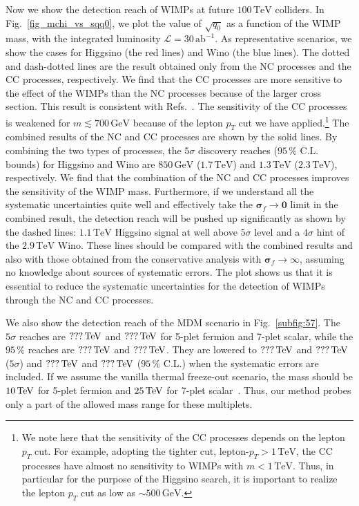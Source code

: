 \documentclass[12pt,twoside,book]{article}
\begin{document}
Now we show the detection reach of WIMPs at future $100\,\mathrm{TeV}$ colliders.
In Fig.~\ref{fig_mchi_vs_sqq0}, we plot the value of $\sqrt{q_0}$ as a function of the WIMP mass, with the integrated luminosity $\mathcal{L}=30\,\mathrm{ab}^{-1}$.
As representative scenarios, we show the cases for Higgsino (the red lines) and Wino (the blue lines).
The dotted and dash-dotted lines are the result obtained only from the NC processes and the CC processes, respectively.
We find that the CC processes are more sensitive to the effect of the WIMPs than the NC processes because of the larger cross section.
This result is consistent with Refs.~\cite{DiLuzio:2018jwd,Matsumoto:2018ioi}.
The sensitivity of the CC processes is weakened for $m \lesssim 700\, \mathrm{GeV}$ because of the lepton $p_T$ cut we have applied.\footnote
{
  We note here that the sensitivity of the CC processes depends on the lepton $p_T$ cut.
  For example, adopting the tighter cut, lepton-$p_T > 1\,\mathrm{TeV}$, the CC processes have almost no sensitivity to WIMPs with $m < 1\,\mathrm{TeV}$.
  Thus, in particular for the purpose of the Higgsino search, it is important to realize the lepton $p_T$ cut as low as $\sim 500\, \mathrm{GeV}$.
}
The combined results of the NC and CC processes are shown by the solid lines.
By combining the two types of processes, the $5\sigma$ discovery reaches ($95\,\%$ C.L. bounds) for Higgsino and Wino are $850\,\mathrm{GeV}$ ($1.7\,\mathrm{TeV}$) and $1.3\,\mathrm{TeV}$ ($2.3\,\mathrm{TeV}$), respectively.
We find that the combination of the NC and CC processes improves the sensitivity of the WIMP mass.
Furthermore, if we understand all the systematic uncertainties quite well and effectively take the $\bm{\sigma}_f \to \bm{0}$ limit in the combined result, the detection reach will be pushed up significantly as shown by the dashed lines: $1.1\,\mathrm{TeV}$ Higgsino signal at well above $5\sigma$ level and a $4\sigma$ hint of the $2.9\,\mathrm{TeV}$ Wino.
These lines should be compared with the combined results and also with those obtained from the conservative analysis with $\bm{\sigma}_f \to \infty$, assuming no knowledge about sources of systematic errors.
The plot shows us that it is essential to reduce the systematic uncertainties for the detection of WIMPs through the NC and CC processes.

We also show the detection reach of the MDM scenario in Fig.~\ref{subfig:57}.
The $5\sigma$ reaches are $???\,{\rm TeV}$ and $???\,{\rm TeV}$ for 5-plet fermion and 7-plet scalar, while the $95\,\%$ reaches are $???\,{\rm TeV}$ and $???\,{\rm TeV}$.
They are lowered to $???\,{\rm TeV}$ and $???\,{\rm TeV}$ ($5\sigma$) and $???\,{\rm TeV}$ and $???\,{\rm TeV}$ ($95\,\%$ C.L.) when the systematic errors are included.
If we assume the vanilla thermal freeze-out scenario, the mass should be $10\,{\rm TeV}$ for 5-plet fermion and $25\,{\rm TeV}$ for 7-plet scalar~\cite{Cirelli:2007xd}.
Thus, our method probes only a part of the allowed mass range for these multiplets.
\end{document}
